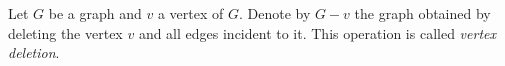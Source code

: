 

\setcounter{section}{2}
\setcounter{subsection}{2}
\setcounter{dfn}{4}

\begin{dfn}
Let $G$ be a graph and $v$ a vertex of $G$.
Denote by $G - v$ the graph obtained by deleting the vertex $v$ and all edges incident to it.
This operation is called \emph{vertex deletion}.
\end{dfn}


